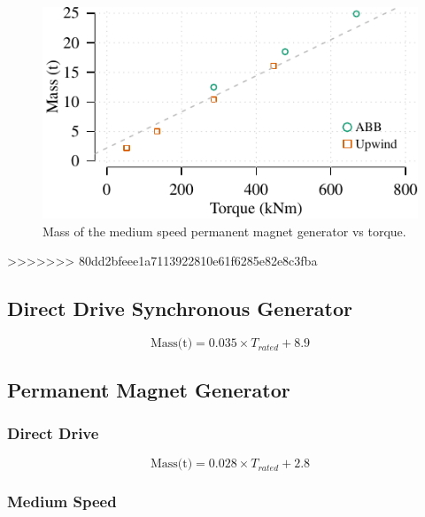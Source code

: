 \documentclass{article}
\begin{document}
\begin{knitrout}
\color{fgcolor}\begin{figure}[]

\includegraphics[width=\maxwidth]{figure/plot1gpm} \caption[Mass of the medium speed permanent magnet generator vs torque]{Mass of the medium speed permanent magnet generator vs torque.\label{fig:plot1gpm}}
\end{figure}


\end{knitrout}

>>>>>>> 80dd2bfeee1a7113922810e61f6285e82e8c3fba


\subsection{Direct Drive Synchronous Generator}

\begin{equation}
  \text{Mass(t)} = 0.035 \times {T_{rated}} + 8.9
\end{equation}

\subsection{Permanent Magnet Generator}

\subsubsection{Direct Drive}

\begin{equation}
  \text{Mass(t)} = 0.028 \times {T_{rated}} + 2.8
\end{equation}


\subsubsection{Medium Speed}
\end{document}
